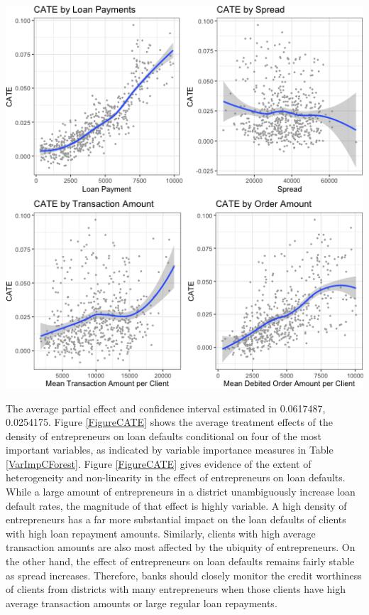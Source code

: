 \documentclass[11pt,preprint, authoryear]{elsarticle}
\let\origfigure\figure
\let\endorigfigure\endfigure
\renewenvironment{figure}[1][2] {
    \expandafter\origfigure\expandafter[H]
} {
    \endorigfigure
}
\numberwithin{equation}{section}
\numberwithin{figure}{section}
\numberwithin{table}{section}
\begin{document}
\begin{figure}[H]

{\centering \includegraphics{DS-Report-20065124_files/figure-latex/FigureCATE-1} 

}

\caption{Conditional Average Treatment Effects (CATE) for 4 Important Variables \label{FigureCATE}}\label{fig:FigureCATE}
\end{figure}

The average partial effect and confidence interval estimated in
0.0617487, 0.0254175. Figure \ref{FigureCATE} shows the average
treatment effects of the density of entrepreneurs on loan defaults
conditional on four of the most important variables, as indicated by
variable importance measures in Table \ref{VarImpCForest}. Figure
\ref{FigureCATE} gives evidence of the extent of heterogeneity and
non-linearity in the effect of entrepreneurs on loan defaults. While a
large amount of entrepreneurs in a district unambiguously increase loan
default rates, the magnitude of that effect is highly variable. A high
density of entrepreneurs has a far more substantial impact on the loan
defaults of clients with high loan repayment amounts. Similarly, clients
with high average transaction amounts are also most affected by the
ubiquity of entrepreneurs. On the other hand, the effect of
entrepreneurs on loan defaults remains fairly stable as spread
increases. Therefore, banks should closely monitor the credit worthiness
of clients from districts with many entrepreneurs when those clients
have high average transaction amounts or large regular loan repayments.
\end{document}
